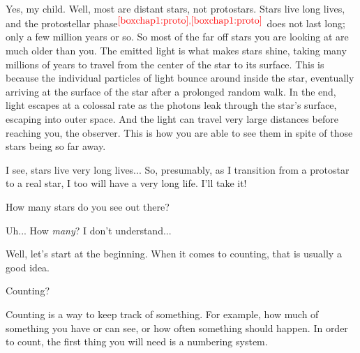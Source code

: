 \documentclass[main.tex]{subfiles}
\begin{document}
\par \Pleione Yes, my child.  Well, most are distant stars, not protostars.  Stars live long lives, and the protostellar phase$^{\textcolor{red}{{\ref{boxchap1:proto}},\textcolor{red}{\ref{boxchap1:proto}}}}$ does not last long; only a few million years or so.  So most of the far off stars you are looking at are much older than you.  The emitted light is what makes stars shine, taking many millions of years to travel from the center of the star to its surface.  This is because the individual particles of light bounce around inside the star, eventually arriving at the surface of the star after a prolonged random walk.  In the end, light escapes at a colossal rate as the photons leak through the star's surface, escaping into outer space.  And the light can travel very large distances before reaching you, the observer.  This is how you are able to see them in spite of those stars being so far away.  


\par \Maia I see, stars live very long lives...  So, presumably, as I transition from a protostar to a real star, I too will have a very long life.  I'll take it!  

\par \Pleione How many stars do you see out there?

\par \Maia Uh... How \textit{many}?  I don't understand...

\par \Pleione Well, let's start at the beginning.  When it comes to counting, that is usually a good idea.

\par \Maia Counting?

\par \Pleione  Counting is a way to keep track of something.  For example, how much of something you have or can see, or how often something should happen.  In order to count, the first thing you will need is a numbering system.

\end{document}
